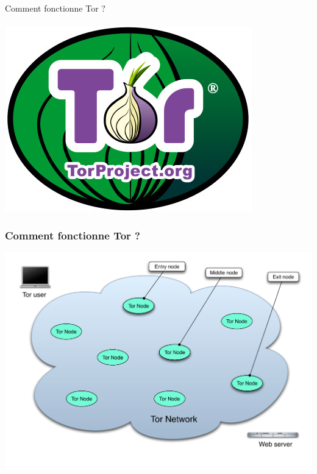 \documentclass{beamer}
\begin{document}
\begin{frame}
\begin{center}
\Huge{Comment fonctionne Tor ? }
\\~\\ \includegraphics[scale=0.4]{./images/logo_tor.jpg}
\end{center}
\end{frame}
\begin{frame}
\frametitle{Comment fonctionne Tor ?}
\begin{center}
\includegraphics[keepaspectratio,width=\textwidth, height=.8\textheight]{images/tor-safe-selection}
\end{center}
\end{frame}
\end{document}
